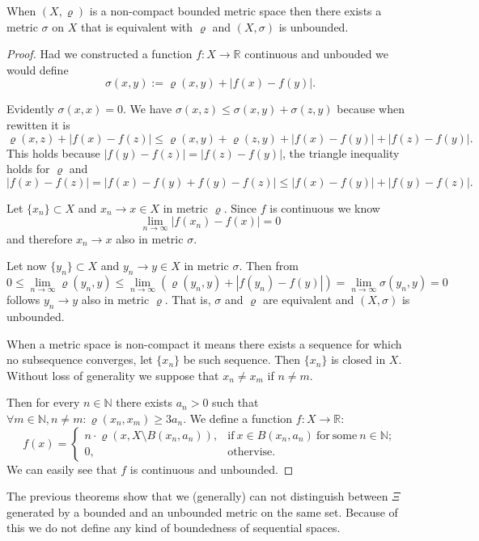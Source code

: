 \begin{theorem} \label{th:bdtounbd}
When $(X,\varrho)$ is a non-compact bounded metric space then there exists a metric $\sigma$ on $X$ that is equivalent with $\varrho$ and $(X,\sigma)$ is unbounded.
\end{theorem}
\begin{proof}
Had we constructed a function $f: X\to \mathbb{R}$ continuous and unbouded we would define
\[
	\sigma(x,y):=\varrho(x,y)+|f(x)-f(y)|.
\]

Evidently $\sigma(x,x)=0$. We have $\sigma(x,z) \le \sigma(x,y)+\sigma(z,y)$ because when rewitten it is
\[
	\varrho(x,z)+|f(x)-f(z)| \le \varrho(x,y)+\varrho(z,y)+|f(x)-f(y)|+|f(z)-f(y)|.\nonumber
\]
This holds because $|f(y)-f(z)|=|f(z)-f(y)|$, the triangle inequality holds for $\varrho$ and
\[
	|f(x)-f(z)|=|f(x)-f(y)+f(y)-f(z)|\le |f(x)-f(y)|+|f(y)-f(z)|.
\]

Let $\{x_n\}\subset X$ and $x_n\to x\in X$ in metric $\varrho$. Since $f$ is continuous we know
\[
	\lim_{n\to\infty}|f(x_n)-f(x)|=0
\]
and therefore $x_n\to x$ also in metric $\sigma$.

Let now $\{y_n\}\subset X$ and $y_n\to y\in X$ in metric $\sigma$. Then from
\[
	0\le\lim_{n\to\infty} \varrho(y_n,y)\le\lim_{n\to\infty} \left(\varrho(y_n,y) + |f(y_n)-f(y)|\right)=\lim_{n\to\infty} \sigma(y_n,y)=0
\]
follows  $y_n\to y$ also in metric $\varrho$. That is, $\sigma$ and $\varrho$ are equivalent and $(X,\sigma)$ is unbounded.

When a metric space is non-compact it means there exists a sequence for which no subsequence converges, let $\{x_n\}$ be such sequence. Then $\{x_n\}$ is closed in $X$. Without loss of generality we suppose that $x_n\ne x_m$ if $n\ne m$. 

Then for every $n\in \mathbb{N}$ there exists $a_n>0$ such that $\forall m\in\mathbb{N}, n\ne m: \varrho(x_n,x_m)\ge 3a_n$. 
We define a function $f: X\to \mathbb{R}$:
\[
	f(x)=\left\{ \begin{array}{ll}n\cdot\varrho(x, X\setminus B(x_n, a_n)), & \mathrm{if}\ x\in B(x_n, a_n)\ \mathrm{for\ some}\ n\in\mathbb{N}; \\ 0, & \mathrm{othervise}. \end{array} \right.
\]
We can easily see that $f$ is continuous and unbounded.
\end{proof}

The previous theorems show that we (generally) can not distinguish between $\Xi$ generated by a bounded and an unbounded metric on the same set. Because of this we do not define any kind of boundedness of sequential spaces.

